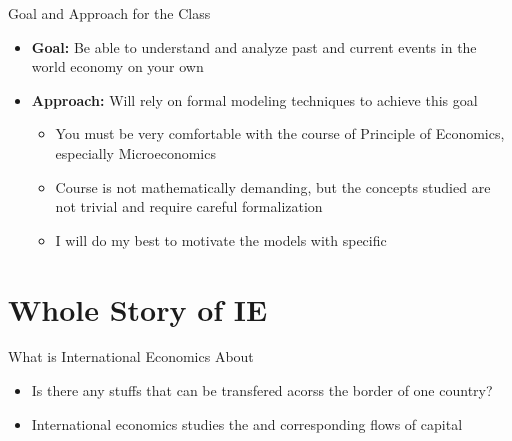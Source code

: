 \documentclass[10pt,hyperref={CJKbookmarks=true},xcolor=dvipsnames,aspectratio=169]{beamer}
\begin{document}
\begin{frame}{Goal and Approach for the Class}

\begin{itemize}
\item \textbf{Goal:} Be able to understand and analyze past and current
events in the world economy on your own
\item \textbf{Approach:} Will rely on formal modeling techniques to achieve
this goal
\begin{itemize}
\item You must be very comfortable with the course of Principle of Economics,
especially Microeconomics
\item Course is not mathematically demanding, but the concepts studied are
not trivial and require careful formalization 
\item I will do my best to motivate the models with specific 
\end{itemize}
\end{itemize}
\end{frame}

\section{Whole Story of IE}%
\begin{frame}{What is International Economics About}

\begin{itemize}
\item Is there any stuffs that can be transfered acorss the border of one country?
\item International economics studies the  and corresponding flows of capital   

\end{itemize}

\end{frame}
\end{document}
